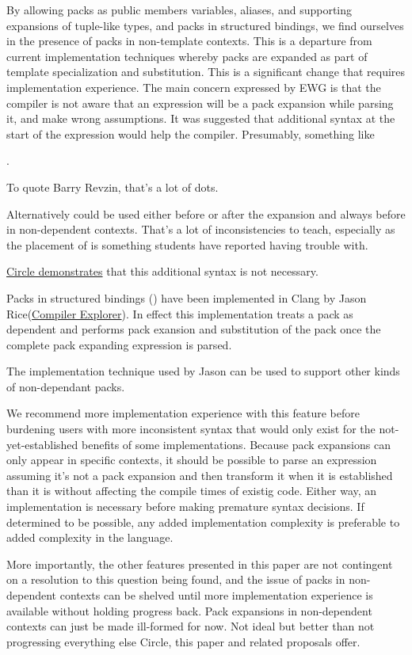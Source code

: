 \documentclass{wg21}
\begin{document}
By allowing packs as public members variables, aliases, and supporting expansions of tuple-like types,
and packs in structured bindings, we find ourselves in the presence of packs in non-template contexts.
This is a departure from current implementation techniques whereby packs are expanded as part of template specialization and substitution.
This is a significant change that requires implementation experience.
The main concern expressed by EWG is that the compiler is not aware that an expression will be a pack expansion while parsing it,
and make wrong assumptions.
It was suggested that additional syntax at the start of the expression would help the compiler. Presumably, something like

.

To quote Barry Revzin, that's a lot of dots.

Alternatively  could be used either before or after the expansion and always before in non-dependent contexts. That's a lot of inconsistencies to teach, especially as the placement of  is something students have reported having trouble with.

\href{https://godbolt.org/z/9ef4r69Wh}{Circle demonstrates} that this additional syntax is not necessary.

Packs in structured bindings () have been implemented in Clang by Jason Rice(\href{https://godbolt.org/z/Tnz4e1dY9}{Compiler Explorer}). In effect this implementation treats a pack as dependent and performs
pack exansion and substitution of the pack once the complete pack expanding expression is parsed.

The implementation technique used by Jason can be used to support other kinds of non-dependant packs.

We recommend more implementation experience with this feature before burdening users with more inconsistent syntax
that would only exist for the not-yet-established benefits of some implementations.
Because pack expansions can only appear in specific contexts, it should be possible to parse an expression
assuming it's not a pack expansion and then transform it when it is established than it is without affecting the compile times of existig code.
Either way, an implementation is necessary before making premature syntax decisions.
If determined to be possible, any added implementation complexity is preferable to added complexity in the language.

More importantly, the other features presented in this paper are not contingent on a resolution to this question being found, and the issue of packs in non-dependent contexts can be shelved until more implementation experience is available without holding progress back.
Pack expansions in non-dependent contexts can just be made ill-formed for now. Not ideal but better than not progressing everything else Circle, this paper and related proposals offer.
\end{document}
